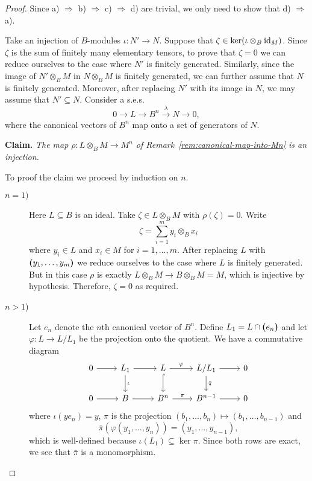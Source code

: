 \begin{proof}
    Since a) $\Rightarrow$ b) $\Rightarrow$ c) $\Rightarrow$ d) are trivial, we only need to show that d) $\Rightarrow$ a).

    Take an injection of $B$-modules $\iota\colon N'\to N$. Suppose that $\zeta\in\ker(\iota\otimes_B\text{\rm id}_M)$. Since $\zeta$ is the sum of finitely many elementary tensors, to prove that $\zeta=0$ we can reduce ourselves to the case where $N'$ is finitely generated. Similarly, since the image of $N'\otimes_B M$ in $N\otimes_BM$ is finitely generated, we can further assume that $N$ is finitely generated. Moreover, after replacing $N'$ with its image in $N$, we may assume that $N'\subseteq N$. Consider a s.e.s.
    $$
        0\to L\to B^n\stackrel\lambda\to N\to0,
    $$
    where the canonical vectors of $B^n$ map onto a set of generators of $N$. 
    
    \textbf{Claim.} \textit{The map $\rho\colon L\otimes_BM\to M^n$ of\/ {\rm Remark~\ref{rem:canonical-map-into-Mn}} is an injection.}

    To proof the claim we proceed by induction on $n$.
    \begin{description}
        \item[$n=1)$] Here $L\subseteq B$ is an ideal. Take $\zeta\in L\otimes_BM$ with $\rho(\zeta)=0$. Write
        $$
            \zeta = \sum_{i=1}^my_i\otimes_Bx_i
        $$
        where $y_i\in L$ and $x_i\in M$ for $i=1,\dots,m$. After replacing $L$ with $\textrm{\boldmath$($}y_1,\dots,y_m\textrm{\boldmath$)$}$ we reduce ourselves to the case where $L$ is finitely generated. But in this case $\rho$ is exactly $L\otimes_BM\to B\otimes_BM=M$, which is injective by hypothesis. Therefore, $\zeta=0$ as required.

        \item[$n>1$)] Let $e_n$ denote the $n$th canonical vector of $B^n$. Define $L_1=L\cap\textrm{\boldmath$($}e_n\textrm{\boldmath$)$}$ and let $\varphi\colon L\to L/L_1$ be the projection onto the quotient. We have a commutative diagram
        $$
            \begin{tikzcd}
                0
                        \arrow[r]
                    &L_1
                        \arrow[r]
                        \arrow[d,"\iota"]
                    &L
                        \arrow[d,hook]
                        \arrow[r,"\varphi"]
                    &L/L_1
                        \arrow[d,"\bar\pi"]
                        \arrow[r]
                    &0\\
                0
                        \arrow[r]
                    &B
                        \arrow[r]
                    &B^n
                        \arrow[r,"\pi"]
                    &B^{n-1}
                        \arrow[r]
                    &0
            \end{tikzcd}
        $$
        where $\iota(ye_n)=y$, $\pi$ is the projection $(b_1,\dots,b_n)\mapsto(b_1,\dots,b_{n-1})$ and
        $$
            \bar\pi(\varphi(y_1,\dots,y_n))=(y_1,\dots,y_{n-1}),
        $$
        which is well-defined because $\iota(L_1)\subseteq\ker\pi$. Since both rows are exact, we see that $\bar\pi$ is a monomorphism.


\end{description}
\end{proof}
